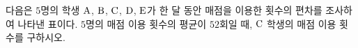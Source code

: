 다음은 $5$명의 학생 $\mathrm{A}$, $\mathrm{B}$, $\mathrm{C}$, $\mathrm{D}$, $\mathrm{E}$가 한 달 동안 매점을 이용한 횟수의 편차를 조사하여 나타낸 표이다. $5$명의 매점 이용 횟수의 평균이 $52$회일 때, $\mathrm{C}$ 학생의 매점 이용 횟수를 구하시오.
\par\smallskip\begin{center}\resizebox{\ifdim\width>\linewidth\linewidth\else\width\fi}{!}{}\end{center}

